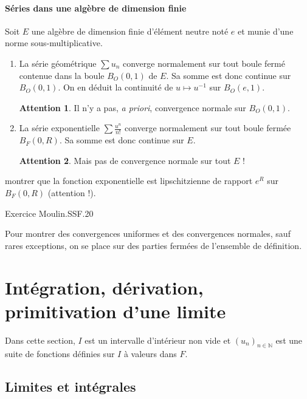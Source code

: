 \documentclass[french]{article}
\newcommand{\N}{\mathbb{N}}
\newcommand{\inv}{^{-1}}
\theoremstyle{plain}
\theoremstyle{definition}
\newtheorem*{attention}{Attention}
\theoremstyle{remark}
\begin{document}
\paragraph{Séries dans une algèbre de dimension finie} Soit $E$ une algèbre de dimension finie d'élément neutre noté $e$ et munie d'une norme sous-multiplicative.
\begin{enumerate}
	\item La série géométrique $\displaystyle\sum u_n$ converge normalement sur tout boule fermé contenue dans la boule $B_O(0,1)$ de $E$. Sa somme est donc continue sur $B_O(0,1)$. On en déduit la continuité de $u\mapsto u\inv$ sur $B_O(e,1)$.
	\begin{attention}
		Il n'y a pas, \textit{a priori}, convergence normale sur $B_O(0,1)$.
	\end{attention}
	\item La série exponentielle $\displaystyle\sum\frac{u^n}{n!}$ converge normalement sur tout boule fermée $B_F(0,R)$. Sa somme est donc continue sur $E$.
	\begin{attention}
		Mais pas de convergence normale sur tout $E$ !
	\end{attention}
\end{enumerate}

\begin{exo}
	montrer que la fonction exponentielle est lipschitzienne de rapport $e^R$ sur $B_F(0,R)$ (attention !).
\end{exo}

Exercice Moulin.SSF.20

\begin{met}
	Pour montrer des convergences uniformes et des convergences normales, sauf rares exceptions, on se place sur des parties fermées de l'ensemble de définition.
\end{met}

\section{Intégration, dérivation, primitivation d'une limite}

Dans cette section, $I$ est un intervalle d'intérieur non vide et $(u_n)_{n\in\N}$ est une suite de fonctions définies sur $I$ à valeurs dans $F$.

\subsection{Limites et intégrales}
\end{document}
